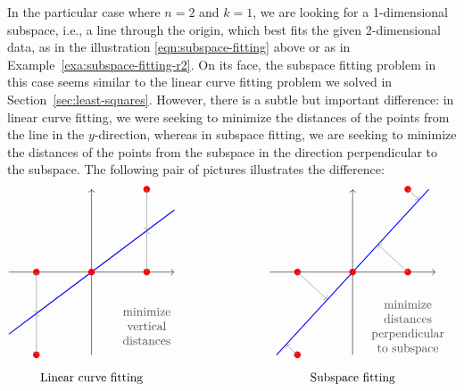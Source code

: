 \documentclass{ximera}
\begin{document}
In the particular case where $n=2$ and $k=1$, we are looking for a
1-dimensional subspace, i.e., a line through the origin, which best
fits the given 2-dimensional data, as in the illustration
{\eqref{eqn:subspace-fitting}} above or as in
Example~\ref{exa:subspace-fitting-r2}. On its face, the subspace
fitting problem in this case seems similar to the linear curve
fitting%
 problem we solved in
Section~\ref{sec:least-squares}. However, there is a subtle but
important difference: in linear curve fitting, we were seeking to
minimize the distances of the points from the line in the
$y$-direction, whereas in subspace fitting, we are seeking to minimize
the distances of the points from the subspace in the direction
perpendicular to the subspace. The following pair of pictures
illustrates the difference:
\begin{equation*}
  \begin{tikzpicture}[scale=0.8]
    \draw[thin,->] (-3,0) -- (3,0);
    \draw[thin,->] (0,-3) -- (0,3);
    \draw[thick,blue] (-3,-3*0.75) -- (3,3*0.75);
    \fill[color=red] (0,0) circle (0.12);
    \fill[color=red] (2,0) circle (0.12);
    \fill[color=red] (2,3) circle (0.12);
    \fill[color=red] (-2,0) circle (0.12);
    \fill[color=red] (-2,-3) circle (0.12);
    \draw[<->,black!50] (2,0) -- (2,1.5);
    \draw[<->,black!50] (2,3) -- (2,1.5);
    \draw[<->,black!50] (-2,0) -- (-2,-1.5);
    \draw[<->,black!50] (-2,-3) -- (-2,-1.5);
    \path (0,-3.5) node[below] {Linear curve fitting};
    \path[black!70] (2,-2) node {\begin{tabular}{c}minimize\\vertical\\distances\end{tabular}};
  \end{tikzpicture}
  \hspace{1in}
  \begin{tikzpicture}[scale=0.8]
    \draw[thin,->] (-3,0) -- (3,0);
    \draw[thin,->] (0,-3) -- (0,3);
    \draw[thick,blue] (-3*0.92,-3) -- (3*0.92, 3);
    \fill[color=red] (0,0) circle (0.12);
    \fill[color=red] (2,0) circle (0.12);
    \fill[color=red] (2,3) circle (0.12);
    \fill[color=red] (-2,0) circle (0.12);
    \fill[color=red] (-2,-3) circle (0.12);
    \draw[<->,black!50] (2,0) -- (0.997*0.92,0.997);
    \draw[<->,black!50] (2,3) -- (2.621*0.92,2.621);
    \draw[<->,black!50] (-2,0) -- (-0.997*0.92,-0.997);
    \draw[<->,black!50] (-2,-3) -- (-2.621*0.92,-2.621);
    \path (0,-3.5) node[below] {Subspace fitting};
    \path[black!70] (2,-2) node {\begin{tabular}{c}minimize\\distances\\perpendicular\\to subspace\end{tabular}};
  \end{tikzpicture}
\end{equation*}
\end{document}
